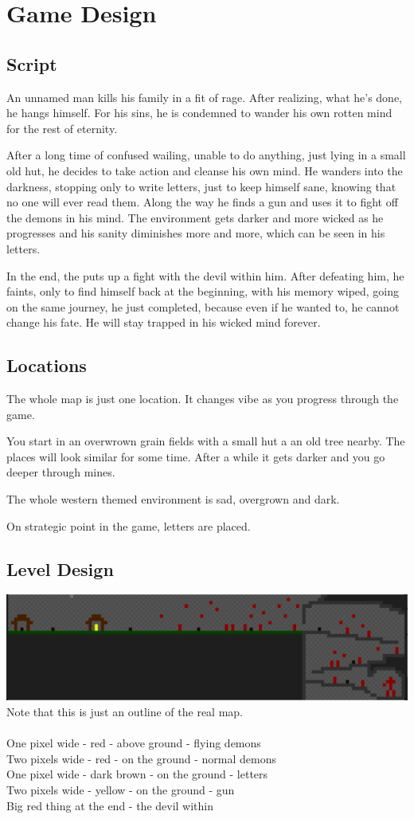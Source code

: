 \documentclass{article}
\begin{document}
\section{Game Design}
\subsection{Script}
An unnamed man kills his family in a fit of rage. After realizing, what he's done, he hangs himself. For his sins, he is condemned to wander his own rotten mind for the rest of eternity.

After a long time of confused wailing, unable to do anything, just lying in a small old hut, he decides to take action and cleanse his own mind. He wanders into the darkness, stopping only to write letters, just to keep himself sane, knowing that no one will ever read them. Along the way he finds a gun and uses it to fight off the demons in his mind. The environment gets darker and more wicked as he progresses and his sanity diminishes more and more, which can be seen in his letters.

In the end, the puts up a fight with the devil within him. After defeating him, he faints, only to find himself back at the beginning, with his memory wiped, going on the same journey, he just completed, because even if he wanted to, he cannot change his fate. He will stay trapped in his wicked mind forever.
\subsection{Locations}
The whole map is just one location. It changes vibe as you progress through the game.

You start in an overwrown grain fields with a small hut a an old tree nearby. The places will
look similar for some time. After a while it gets darker and you go deeper through mines.

The whole western themed environment is sad, overgrown and dark.

On strategic point in the game, letters are placed.
\subsection{Level Design}
\includegraphics{level_design.png}\\
Note that this is just an outline of the real map.\\
\\
One pixel wide - red - above ground - flying demons\\
Two pixels wide - red - on the ground - normal demons\\
One pixel wide - dark brown - on the ground - letters\\
Two pixels wide - yellow - on the ground - gun\\
Big red thing at the end - the devil within
\end{document}
